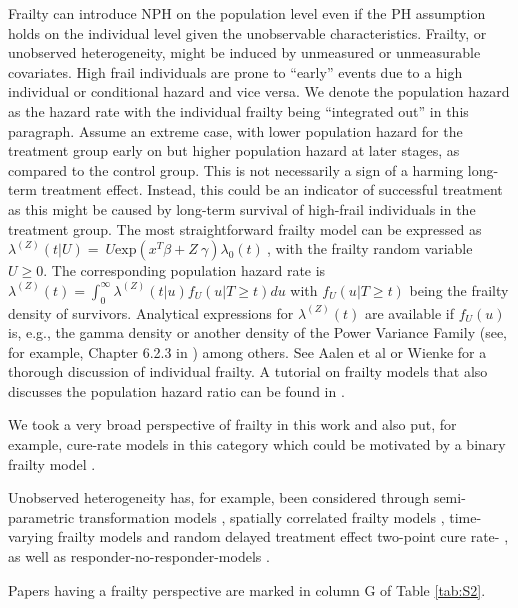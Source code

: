 \noindent Frailty can introduce NPH on the population level even if the PH assumption holds on the individual level given the unobservable characteristics. Frailty, or unobserved heterogeneity, might be induced by unmeasured or unmeasurable covariates. High frail individuals are prone to ``early'' events due to a high individual or conditional hazard and vice versa. We denote the population hazard as the hazard rate with the individual frailty being ``integrated out'' in this paragraph. Assume an extreme case, with lower population hazard for the treatment group early on but higher population hazard at later stages, as compared to the control group. This is not necessarily a sign of a harming long-term treatment effect. Instead, this could be an indicator of successful treatment as this might be caused by long-term survival of high-frail individuals in the treatment group. The most straightforward frailty model can be expressed as ${\lambda }^{(Z)}\left(t|U\right)=\ U{\mathrm{exp} \left(x^T\beta +Z\ \gamma \right){\lambda }_0(t)\ }$, with the frailty random variable $U\geq 0$. The corresponding population hazard rate is ${\lambda }^{\left(Z\right)}\left(t\right)=\int^{\infty }_0{{\lambda }^{\left(Z\right)}\left(t|u\right)}f_U(u|T\ge t)du$ with $f_U(u|T\geq t)$ being the frailty density of survivors. Analytical expressions for ${\lambda }^{\left(Z\right)}(t)$ are available if $f_U(u)$ is, e.g., the gamma density or another density of the Power Variance Family (see, for example, Chapter 6.2.3 in \cite{Aalen.2008}) among others. See Aalen et al \cite{Aalen.2008} or Wienke \cite{Wienke.2010} for a thorough discussion of individual frailty. A tutorial on frailty models that also discusses the population hazard ratio can be found in \cite{Balan.2020}.

\noindent We took a very broad perspective of frailty in this work and also put, for example, cure-rate models in this category which could be motivated by a binary frailty model \cite{Wienke.2010}. 

\noindent Unobserved heterogeneity has, for example, been considered through semi-parametric transformation models \cite{Choi.2012}, spatially correlated frailty models \cite{Zhang.2011}, time-varying frailty models \cite{Pennell.2006} and random delayed treatment effect two-point cure rate-  \cite{Wu.2022}, as well as responder-no-responder-models \cite{Xu.2020}. 

\noindent Papers having  a frailty perspective are marked in column G of Table \ref{tab:S2}. 

